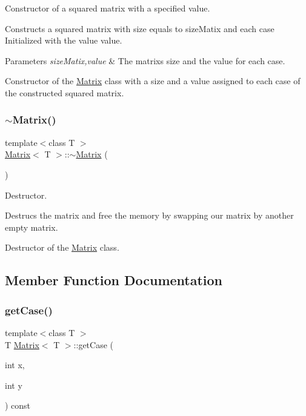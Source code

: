 Constructor of a squared matrix with a specified value. 

Constructs a squared matrix with size equals to size\+Matix and each case Initialized with the value value.


\begin{DoxyParams}{Parameters}
{\em size\+Matix,value} & The matrix\textquotesingle{}s size and the value for each case.\\
\hline
\end{DoxyParams}
Constructor of the \mbox{\hyperlink{class_matrix}{Matrix}} class with a size and a value assigned to each case of the constructed squared matrix. \mbox{\label{class_matrix_a91aa704de674203e96aece9e1955ccd3}} 
\subsubsection{\texorpdfstring{$\sim$\+Matrix()}{~Matrix()}}
{\footnotesize\ttfamily template$<$class T $>$ \\
\mbox{\hyperlink{class_matrix}{Matrix}}$<$ T $>$\+::$\sim$\mbox{\hyperlink{class_matrix}{Matrix}} (\begin{DoxyParamCaption}{ }\end{DoxyParamCaption})\hspace{0.3cm}{\ttfamily [virtual]}}



Destructor. 

Destrucs the matrix and free the memory by swapping our matrix by another empty matrix.

Destructor of the \mbox{\hyperlink{class_matrix}{Matrix}} class. 

\subsection{Member Function Documentation}
\mbox{\label{class_matrix_afc8b612ca8e7afb5466a516694d4227b}} 
\subsubsection{\texorpdfstring{get\+Case()}{getCase()}}
{\footnotesize\ttfamily template$<$class T $>$ \\
T \mbox{\hyperlink{class_matrix}{Matrix}}$<$ T $>$\+::get\+Case (\begin{DoxyParamCaption}\item[{int}]{x,  }\item[{int}]{y }\end{DoxyParamCaption}) const}



